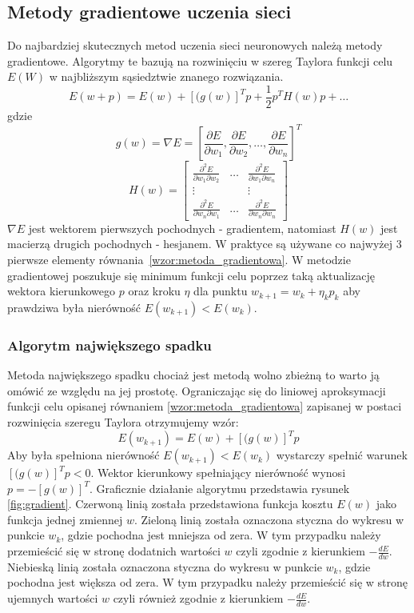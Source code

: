 \subsection{Metody gradientowe uczenia sieci}
Do najbardziej skutecznych metod uczenia sieci neuronowych należą metody gradientowe. Algorytmy te bazują na rozwinięciu w szereg Taylora funkcji celu $E(W)$ w najbliższym sąsiedztwie znanego rozwiązania\cite{Osowski}.
\begin{equation}
	\label{wzor:metoda_gradientowa}
	E(w + p) = E(w) + [(g(w)]^Tp + \frac{1}{2}p^TH(w)p + \hdots
\end{equation}
gdzie
$$g(w) = \nabla E = [\frac{\partial E}{\partial w_1}, \frac{\partial E}{\partial w_2}, \hdots, \frac{\partial E}{\partial w_n}]^T$$
$$H(w) = \begin{bmatrix}
\frac{\partial^2 E}{\partial w_1 \partial w_2} & \hdots & \frac{\partial^2 E}{\partial w_1 \partial w_n}\\
\vdots & & \vdots \\
\frac{\partial^2 E}{\partial w_n \partial w_1} & \hdots & \frac{\partial^2 E}{\partial w_n \partial w_n}
\end{bmatrix}$$
$\nabla E$ jest wektorem pierwszych pochodnych - gradientem, natomiast $H(w)$ jest macierzą drugich pochodnych - hesjanem. W praktyce są używane co najwyżej 3 pierwsze elementy równania~\eqref{wzor:metoda_gradientowa}. W metodzie gradientowej poszukuje się minimum funkcji celu poprzez taką aktualizację wektora kierunkowego $p$ oraz kroku $\eta$ dla punktu $w_{k+1} = w_k + \eta_k p_k$ aby prawdziwa była nierówność $E(w_{k+1}) < E(w_k)$.

\subsubsection*{Algorytm największego spadku}
Metoda największego spadku chociaż jest metodą wolno zbieżną to warto ją omówić ze względu na jej prostotę. Ograniczając się do liniowej aproksymacji funkcji celu opisanej równaniem \eqref{wzor:metoda_gradientowa} zapisanej w postaci rozwinięcia szeregu Taylora otrzymujemy wzór:
\begin{equation}
	E(w_{k+1}) = E(w) + [(g(w)]^Tp
\end{equation} 
Aby była spełniona nierówność $E(w_{k+1}) < E(w_k)$ wystarczy spełnić warunek $[(g(w)]^Tp < 0$. Wektor kierunkowy spełniający nierówność wynosi $p = -[g(w)]^T$. Graficznie działanie algorytmu przedstawia rysunek \ref{fig:gradient}. Czerwoną linią została przedstawiona funkcja kosztu $E(w)$ jako funkcja jednej zmiennej $w$. Zieloną linią została oznaczona styczna do wykresu w punkcie $w_k$, gdzie pochodna jest mniejsza od zera. W tym przypadku należy przemieścić się w stronę dodatnich wartości $w$ czyli zgodnie z kierunkiem $-\frac{dE}{dw}$. Niebieską linią została oznaczona styczna do wykresu w punkcie $w_k$, gdzie pochodna jest większa od zera. W tym przypadku należy przemieścić się w stronę ujemnych wartości $w$ czyli również zgodnie z kierunkiem $-\frac{dE}{dw}$.


